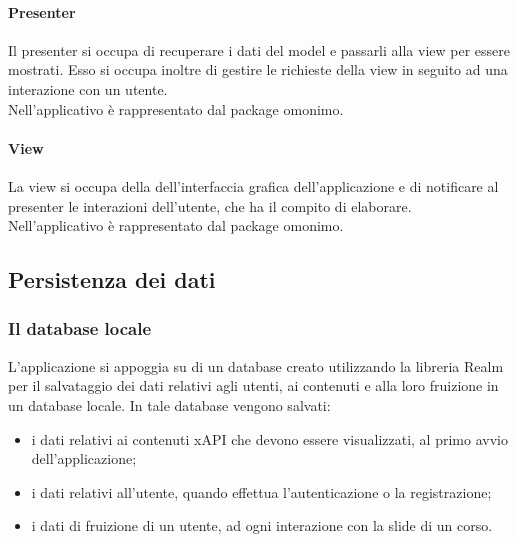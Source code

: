 \documentclass[../Tesi.tex]{subfiles}
\begin{document}
		\paragraph*{Presenter}
		Il presenter si occupa di recuperare i dati del model e passarli alla view per essere mostrati. Esso si occupa inoltre di gestire le richieste della view in seguito ad una interazione con un utente. \\ Nell'applicativo è rappresentato dal package omonimo.

		\paragraph*{View}
		La view si occupa della dell'interfaccia grafica dell'applicazione e di notificare al presenter le interazioni dell'utente, che ha il compito di elaborare. \\ Nell'applicativo è rappresentato dal package omonimo.
	
	\subsection{Persistenza dei dati}
		\subsubsection{Il database locale}
		L'applicazione si appoggia su di un database creato utilizzando la libreria Realm per il salvataggio dei dati relativi agli utenti, ai contenuti e alla loro fruizione in un database locale. In tale database vengono salvati:
		\begin{itemize}
			\item i dati relativi ai contenuti xAPI che devono essere visualizzati, al primo avvio dell'applicazione;
			\item i dati relativi all'utente, quando effettua l'autenticazione o la registrazione;
			\item i dati di fruizione di un utente, ad ogni interazione con la slide di un corso.
		\end{itemize}
			
\end{document}
